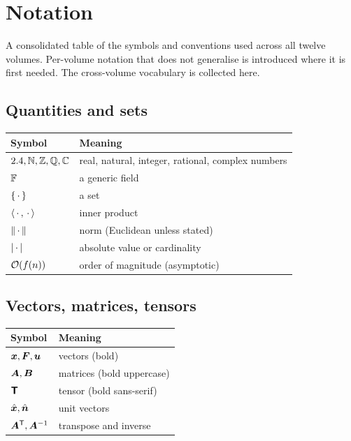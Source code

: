\chapter*{Notation}
\label{frontmatter:notation}

A consolidated table of the symbols and conventions used across all twelve volumes. Per-volume notation that does not generalise is introduced where it is first needed. The cross-volume vocabulary is collected here.

\section*{Quantities and sets}

\begin{tabular}{ll}
  \toprule
  Symbol & Meaning \\
  \midrule
  $2.4, \mathbb{N}, \mathbb{Z}, \mathbb{Q}, \mathbb{C}$ & real, natural, integer, rational, complex numbers \\
  $\mathbb{F}$ & a generic field \\
  $\{\,\cdot\,\}$ & a set \\
  $\langle\,\cdot\,,\,\cdot\,\rangle$ & inner product \\
  $\lVert\,\cdot\,\rVert$ & norm (Euclidean unless stated) \\
  $\lvert\,\cdot\,\rvert$ & absolute value or cardinality \\
  $\mathcal{O}\!\left(f(n)\right)$ & order of magnitude (asymptotic) \\
  \bottomrule
\end{tabular}

\section*{Vectors, matrices, tensors}

\begin{tabular}{ll}
  \toprule
  Symbol & Meaning \\
  \midrule
  $\bm{x}, \bm{F}, \bm{u}$ & vectors (bold) \\
  $\bm{A}, \bm{B}$ & matrices (bold uppercase) \\
  $\bm{\mathsf{T}}$ & tensor (bold sans-serif) \\
  $\hat{\bm{x}}, \hat{\bm{n}}$ & unit vectors \\
  $\bm{A}^{\mathsf{T}}, \bm{A}^{-1}$ & transpose and inverse \\
  \bottomrule
\end{tabular}

